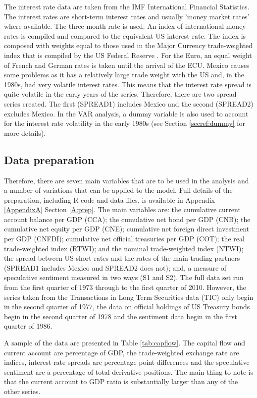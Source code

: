 \documentclass[12pt, a4paper, oneside]{article}\usepackage[]{graphicx}\usepackage[]{color}
\begin{document}
The interest rate data are taken from the IMF International Financial Statistics.  The interest rates are short-term interest rates and usually 'money market rates' where available.  The three month rate is used. An index of international money rates is compiled and compared to the equivalent US interest rate. The index is composed with weights equal to those used in the Major Currency trade-weighted index that is compiled by the US Federal Reserve \citep{Fedtwi}.  For the Euro, an equal weight of French and German rates is taken until the arrival of the ECU.   Mexico causes some problems as it has a relatively large trade weight with the US and, in the 1980s, had very volatile interest rates.  This means that the interest rate spread is quite volatile in the early years of the series.  Therefore, there are two spread series created.  The first (SPREAD1) includes Mexico and the second (SPREAD2) excludes Mexico.  In the VAR analysis, a dummy variable is also used to account for the interest rate volatility in the early 1980s (see Section \ref{secref:dummy} for more details).    

\subsection{Data preparation}
Therefore, there are seven main variables that are to be used in the analysis and a number of variations that can be applied to the model.  Full details of the preparation, including R code and data files, is available in Appendix \ref{AppendixA} Section \ref{A:prep}.  The main variables are: the cumulative current account balance per GDP (CCA); the cumulative net bond per GDP (CNB); the cumulative net equity per GDP (CNE); cumulative net foreign direct investment per GDP (CNFDI); cumulative net official treasuries per GDP (COT); the real trade-weighted index (RTWI); and the nominal trade-weighted index (NTWI); the spread between US short rates and the rates of the main trading partners (SPREAD1 includes Mexico and SPREAD2 does not); and, a measure of speculative sentiment measured in two ways (S1 and S2).  The full data set run from the first quarter of 1973 through to the first quarter of 2010.  However, the series taken from the Transactions in Long Term Securities data (TIC) only begin in the second quarter of 1977, the data on official holdings of US Treasury bonds begin in the second quarter of 1978 and the sentiment data begin in the first quarter of 1986.   

A sample of the data are presented in Table \ref{tab:capflow}.   The capital flow and current account are percentage of GDP, the trade-weighted exchange rate are indices, interest-rate spreads are percentage point differences and the speculative sentiment are a percentage of total derivative positions. The main thing to note is that the current account to GDP ratio is substantially larger than any of the other series.  
\end{document}
